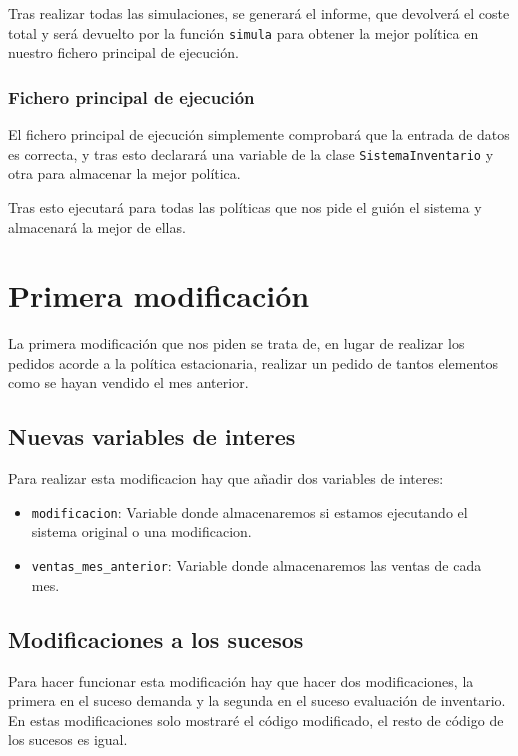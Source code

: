\documentclass[12pt, spanish]{article}
\begin{document}
Tras realizar todas las simulaciones, se generará el informe, que devolverá el coste total y será devuelto por la función \texttt{simula} para obtener la mejor política en nuestro fichero principal de ejecución.

\subsubsection{Fichero principal de ejecución}

El fichero principal de ejecución simplemente comprobará que la entrada de datos es correcta, y tras esto declarará una variable de la clase \texttt{SistemaInventario} y otra para almacenar la mejor política.

Tras esto ejecutará para todas las políticas que nos pide el guión el sistema y almacenará la mejor de ellas.



\section{Primera modificación}

La primera modificación que nos piden se trata de, en lugar de realizar los pedidos acorde a la política estacionaria, realizar un pedido de tantos elementos como se hayan vendido el mes anterior.

\subsection{Nuevas variables de interes}

Para realizar esta modificacion hay que añadir dos variables de interes:

\begin{itemize}
	\item \texttt{modificacion}: Variable donde almacenaremos si estamos ejecutando el sistema original o una modificacion.
	\item \texttt{ventas\_mes\_anterior}: Variable donde almacenaremos las ventas de cada mes.
\end{itemize}

\subsection{Modificaciones a los sucesos}

Para hacer funcionar esta modificación hay que hacer dos modificaciones, la primera en el suceso demanda y la segunda en el suceso evaluación de inventario. En estas modificaciones solo mostraré el código modificado, el resto de código de los sucesos es igual.
\end{document}
